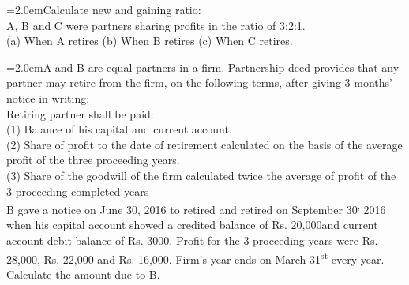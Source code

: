 \documentclass[11pt,a4paper]{article}
\newcommand{\lqn}[2]{\Needspace{6\baselineskip}\par\medskip\noindent\hangindent=2.0em\hangafter=1\makebox[2.0em][l]{\textbf{#1.}}#2\par}
\begin{document}
\lqn{99}{Calculate new and gaining ratio:\\
A, B and C were partners sharing profits in the ratio of 3:2:1.\\
(a) When A retires   (b) When B retires          (c) When C retires.\par
}
\lqn{100}{A and B are equal partners in a firm. Partnership deed provides that any partner may retire from the firm, on the following terms, after giving 3 months’ notice in writing:\\
Retiring partner shall be paid:\\
(1) Balance of his capital and current account.\\
(2) Share of profit to the date of retirement calculated on the basis of the average profit of the three proceeding years.\\
(3) Share of the goodwill of the firm calculated twice the average of profit of the 3 proceeding completed years\\
B gave a notice on June 30, 2016 to retired and retired on September 30\textsuperscript{,}  2016 when his capital account showed a credited balance of Rs. 20,000and current account debit balance of Rs. 3000. Profit for the 3 proceeding years were Rs. 28,000, Rs. 22,000 and Rs. 16,000. Firm’s year ends on March 31\textsuperscript{st}  every year.\\
Calculate the amount due to B.\par
}
\end{document}

